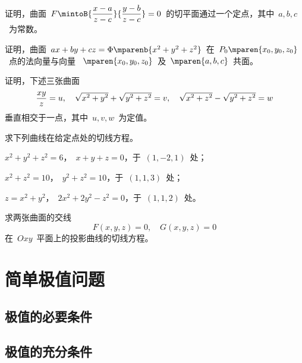 \begin{exercise}
\item 证明，曲面~$F\mintoB{\dfrac{x-a}{z-c}}{\dfrac{y-b}{z-c}}=0$~的切平面通过一个定点，其中~$a,b,c$~为常数。
\item 证明，曲面~$ax+by+cz=\Phi\mparenb{x^2+y^2+z^2}$~在~$P_0\mparen{x_0,y_0,z_0}$~点的法向量与向量
~$\mparen{x_0,y_0,z_0}$~及~$\mparen{a,b,c}$~共面。
\item 证明，下述三张曲面
\[
  \frac{xy}z=u,\quad\txts\smbsqrt{x^2+y^2}+\smbsqrt{y^2+z^2}=v,\quad \smbsqrt{x^2+z^2}-\smbsqrt{y^2+z^2}=w
\]
垂直相交于一点，其中~$u,v,w$~为定值。
\item 求下列曲线在给定点处的切线方程。
\begin{exlistcols}
  \item $x^2+y^2+z^2=6$，~$x+y+z=0$，于~$(1,-2,1)$~处；
  \item $x^2+z^2=10$，~$y^2+z^2=10$，于~$(1,1,3)$~处；
  \item $z=x^2+y^2$，~$2x^2+2y^2-z^2=0$，于~$(1,1,2)$~处。
\end{exlistcols}
\item 求两张曲面的交线
\[
  F(x,y,z)=0,\quad G(x,y,z)=0
\]
在~$Oxy$~平面上的投影曲线的切线方程。
\end{exercise}

\section{简单极值问题}
\subsection{极值的必要条件}
\subsection{极值的充分条件}
